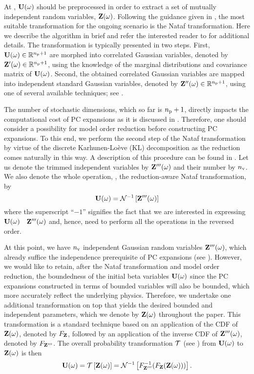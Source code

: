 At , $\mathbf{U}(\omega)$ should be preprocessed in order to extract a set of mutually independent random variables, $\mathbf{Z}(\omega)$.
Following the guidance given in , the most suitable transformation for the ongoing scenario is the Nataf transformation.
Here we describe the algorithm in brief and refer the interested reader to \cite{li2008} for additional details.
The transformation is typically presented in two steps.
First, $\mathbf{U}(\omega) \in \mathbb{R}^{{n_\text{p}} + 1}$ are morphed into correlated Gaussian variables, denoted by $\mathbf{Z}'(\omega) \in \mathbb{R}^{{n_\text{p}} + 1}$, using the knowledge of the marginal distributions and covariance matrix of $\mathbf{U}(\omega)$.
Second, the obtained correlated Gaussian variables are mapped into independent standard Gaussian variables, denoted by $\mathbf{Z}''(\omega) \in \mathbb{R}^{{n_\text{p}} + 1}$, using one of several available techniques; see \cite{li2008}.

The number of stochastic dimensions, which so far is ${n_\text{p}} + 1$, directly impacts the computational cost of PC expansions as it is discussed in .
Therefore, one should consider a possibility for model order reduction before constructing PC expansions.
To this end, we perform the second step of the Nataf transformation by virtue of the discrete Karhunen-Lo\`{e}ve (KL) decomposition \cite{ghanem1991} as the reduction comes naturally in this way.
A description of this procedure can be found in .
Let us denote the trimmed independent variables by $\mathbf{Z}'''(\omega)$ and their number by ${n_\text{v}}$.
We also denote the whole operation, \ie, the reduction-aware Nataf transformation, by
\[
  \mathbf{U}(\omega) = \mathcal{N}^{-1}\left[\mathbf{Z}'''(\omega)\right]
\]
where the superscript ``$-1$'' signifies the fact that we are interested in expressing $\mathbf{U}(\omega)$ \via\ $\mathbf{Z}'''(\omega)$ and, hence, need to perform all the operations in the reversed order.

At this point, we have ${n_\text{v}}$ independent Gaussian random variables $\mathbf{Z}'''(\omega)$, which already suffice the independence prerequisite of PC expansions (see ).
However, we would like to retain, after the Nataf transformation and model order reduction, the boundedness of the initial beta variables $\mathbf{U}(\omega)$ since the PC expansions constructed in terms of bounded variables will also be bounded, which more accurately reflect the underlying physics.
Therefore, we undertake one additional transformation on top that yields the desired bounded and independent parameters, which we denote by $\mathbf{Z}(\omega)$ throughout the paper.
This transformation is a standard technique based on an application of the CDF of $\mathbf{Z}(\omega)$, denoted by $F_{\mathbf{Z}}$, followed by an application of the inverse CDF of $\mathbf{Z}'''(\omega)$, denoted by $F_{\mathbf{Z}'''}$.
The overall probability transformation $\oTransform$ (see ) from $\mathbf{U}(\omega)$ to $\mathbf{Z}(\omega)$ is then
\[
  \vU(\o) = \oTransform{\vZ(\o)} = \oInvNataf{\fCDF^{-1}_{\vZ'''}(\fCDF_{\vZ}(\vZ(\o)))}.
\]
